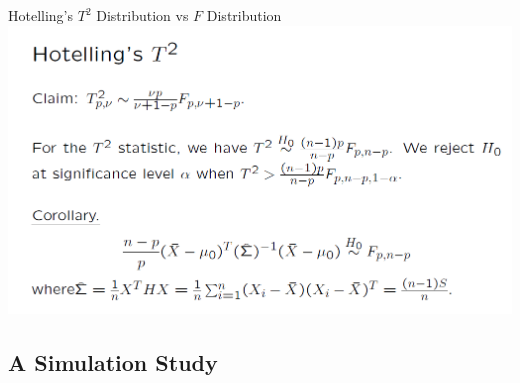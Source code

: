\documentclass[
  ignorenonframetext,
]{beamer}
\begin{document}
\begin{frame}{Hotelling's \(T^2\) Distribution vs \(F\) Distribution}
\protect\hypertarget{hotellings-t2-distribution-vs-f-distribution}{}
\includegraphics[width=0.8\linewidth]{img/T2vsF}
\end{frame}

\hypertarget{a-simulation-study}{%
\subsection{A Simulation Study}\label{a-simulation-study}}
\end{document}
